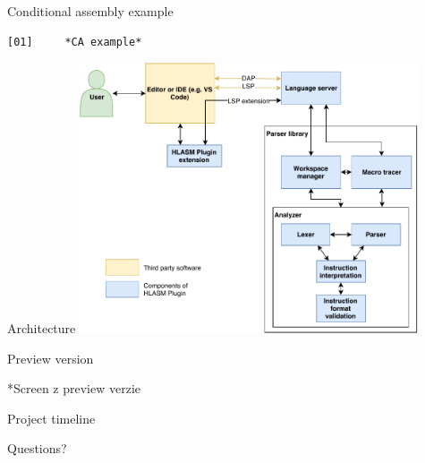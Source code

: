 \documentclass[10pt]{beamer}
\begin{document}
\begin{frame}[fragile]{Conditional assembly example}


\begin{verbatim}
[01]     *CA example*

\end{verbatim}


\end{frame}

\begin{frame}[fragile]{Architecture}
\centering
\includegraphics[width=10cm]{img/hlasm_architecture}

\end{frame}



\begin{frame}[fragile]{Preview version}

*Screen z preview verzie

\end{frame}


\begin{frame}[fragile]{Project timeline}



\end{frame}


\begin{frame}[standout]
  Questions?
\end{frame}
\end{document}
